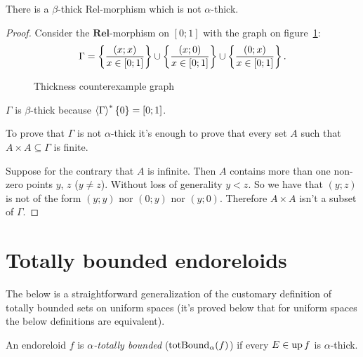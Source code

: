 \begin{example}
There is a $\beta$-thick Rel-morphism which is not $\alpha$-thick.\end{example}
\begin{proof}
Consider the $\mathbf{Rel}$-morphism on $[0;1]$ with the graph on
figure~\ref{fig:thick-counterexample}:
\[
\Gamma=\left\{ \frac{(x;x)}{x\in[0;1]}\right\}\cup\left\{ \frac{(x;0)}{x\in[0;1]}\right\}\cup\left\{ \frac{(0;x)}{x\in[0;1]}\right\}.
\]
\begin{figure}[ht]

\caption{\label{fig:thick-counterexample}Thickness counterexample graph}
\end{figure}


$\Gamma$ is $\beta$-thick because $\left\langle \Gamma\right\rangle ^{\ast}\{0\}=[0;1]$.

To prove that $\Gamma$ is not $\alpha$-thick it's enough to prove
that every set $A$ such that $A\times A\subseteq\Gamma$ is finite.

Suppose for the contrary that $A$ is infinite. Then $A$ contains
more than one non-zero points $y$, $z$ ($y\ne z$). Without loss
of generality $y<z$. So we have that $(y;z)$ is not of the form
$(y;y)$ nor $(0;y)$ nor $(y;0)$. Therefore $A\times A$ isn't a
subset of $\Gamma$.
\end{proof}

\section{Totally bounded endoreloids}

The below is a straightforward generalization of the customary definition
of totally bounded sets on uniform spaces (it's proved below that
for uniform spaces the below definitions are equivalent).
\begin{defn}
An endoreloid $f$ is \emph{$\alpha$-totally bounded} ($\operatorname{totBound}_{\alpha}(f)$)
if every $E\in\operatorname{up} f$ is $\alpha$-thick.
\end{defn}


